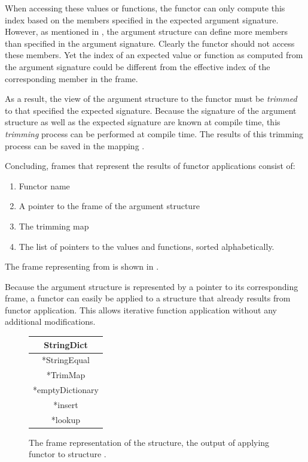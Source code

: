 When accessing these values or functions, the functor can only compute this index based on the members specified in the expected argument signature.
However, as mentioned in , the argument structure can define more members than specified in the argument signature.
Clearly the functor should not access these members.
Yet the index of an expected value or function as computed from the argument signature could be different from the effective index of the corresponding member in the frame.

As a result, the view of the argument structure to the functor must be \emph{trimmed} to that specified the expected signature. 
Because the signature of the argument structure as well as the expected signature are known at compile time, this \emph{trimming} process can be performed at compile time.
The results of this trimming process can be saved in the mapping .

Concluding, frames that represent the results of functor applications consist of:
\begin{enumerate}
\item Functor name
\item A pointer to the frame of the argument structure
\item The trimming map
\item The list of pointers to the values and functions, sorted alphabetically.
\end{enumerate}
The frame representing  from  is shown in .

Because the argument structure is represented by a pointer to its corresponding frame, a functor can easily be applied to a structure that already results from functor application.
This allows iterative function application without any additional modifications.

\begin{figure}[htb]
\centering
\begin{tabular}{|c|}
\hline
StringDict \\
\hline
*StringEqual\\
*TrimMap\\
\hline
*emptyDictionary \\
*insert \\ 
*lookup \\
\hline
\end{tabular}
\caption[Frame Representation Example:StringDict]{The frame representation of the  structure, the output of applying functor  to structure .\label{fig:StringDictFrame}}
\end{figure}

